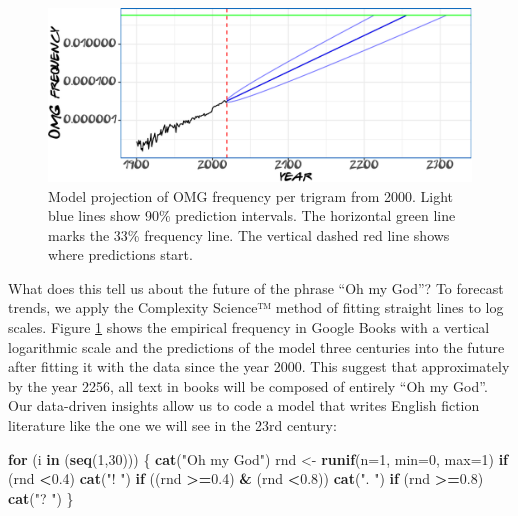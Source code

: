 \documentclass[]{article}
\newenvironment{Shaded}{\begin{snugshade}}{\end{snugshade}}
\newcommand{\ControlFlowTok}[1]{\textcolor[rgb]{0.13,0.29,0.53}{\textbf{#1}}}
\newcommand{\DataTypeTok}[1]{\textcolor[rgb]{0.13,0.29,0.53}{#1}}
\newcommand{\DecValTok}[1]{\textcolor[rgb]{0.00,0.00,0.81}{#1}}
\newcommand{\FloatTok}[1]{\textcolor[rgb]{0.00,0.00,0.81}{#1}}
\newcommand{\KeywordTok}[1]{\textcolor[rgb]{0.13,0.29,0.53}{\textbf{#1}}}
\newcommand{\NormalTok}[1]{#1}
\newcommand{\OperatorTok}[1]{\textcolor[rgb]{0.81,0.36,0.00}{\textbf{#1}}}
\newcommand{\StringTok}[1]{\textcolor[rgb]{0.31,0.60,0.02}{#1}}
\begin{document}
\begin{figure}

{\centering \includegraphics{Friends_HPS_pdf_files/figure-latex/booksmodel-1} 

}

\caption{Model projection of OMG frequency per trigram from 2000. Light blue lines show 90\% prediction intervals. The horizontal green line marks the 33\% frequency line. The vertical dashed red line shows where predictions start.}\label{fig:booksmodel}
\end{figure}

What does this tell us about the future of the phrase ``Oh my God''? To forecast trends, we apply the Complexity Science™ method of fitting straight lines to log scales. Figure \ref{fig:booksmodel} shows the empirical frequency in Google Books with a vertical logarithmic scale and the predictions of the model three centuries into the future after fitting it with the data since the year 2000. This suggest that approximately by the year 2256, all text in books will be composed of entirely ``Oh my God''. Our data-driven insights allow us to code a model that writes English fiction literature like the one we will see in the 23rd century:

\begin{Shaded}
\begin{Highlighting}[]
\ControlFlowTok{for}\NormalTok{ (i }\ControlFlowTok{in}\NormalTok{ (}\KeywordTok{seq}\NormalTok{(}\DecValTok{1}\NormalTok{,}\DecValTok{30}\NormalTok{)))}
\NormalTok{\{}
  \KeywordTok{cat}\NormalTok{(}\StringTok{"Oh my God"}\NormalTok{)}
\NormalTok{  rnd <-}\StringTok{ }\KeywordTok{runif}\NormalTok{(}\DataTypeTok{n=}\DecValTok{1}\NormalTok{, }\DataTypeTok{min=}\DecValTok{0}\NormalTok{, }\DataTypeTok{max=}\DecValTok{1}\NormalTok{)}
  \ControlFlowTok{if}\NormalTok{ (rnd }\OperatorTok{<}\FloatTok{0.4}\NormalTok{)}
    \KeywordTok{cat}\NormalTok{(}\StringTok{"! "}\NormalTok{)}
  \ControlFlowTok{if}\NormalTok{ ((rnd }\OperatorTok{>=}\FloatTok{0.4}\NormalTok{) }\OperatorTok{&}\StringTok{ }\NormalTok{(rnd }\OperatorTok{<}\FloatTok{0.8}\NormalTok{))}
    \KeywordTok{cat}\NormalTok{(}\StringTok{". "}\NormalTok{)}
  \ControlFlowTok{if}\NormalTok{ (rnd }\OperatorTok{>=}\FloatTok{0.8}\NormalTok{)}
    \KeywordTok{cat}\NormalTok{(}\StringTok{"? "}\NormalTok{)}
\NormalTok{  \}}
\end{Highlighting}
\end{Shaded}
\end{document}
